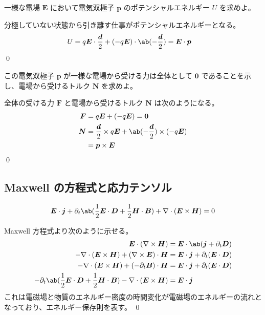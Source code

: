 \documentclass[uplatex,dvipdfmx,a4paper,11pt]{jlreq}
\makeatletter
\newcommand{\EE}{\bm{E}}
\newcommand{\DD}{\bm{D}}
\newcommand{\BB}{\bm{B}}
\newcommand{\HH}{\bm{H}}
\newcommand{\pp}{\bm{p}}
\newcommand{\vnabla}{\mathbf{\nabla}}
\theoremstyle{definition}
\renewenvironment{proof}[1][\proofname]{\par
  \normalfont
  \topsep6\p@\@plus6\p@ \trivlist
  \item[\hskip\labelsep{\bfseries #1}\@addpunct{\bfseries}]\ignorespaces\quad\par
}{%
  \qed\endtrivlist\@endpefalse
}
\renewcommand\proofname{証明}
\makeatother
\begin{document}
\begin{problem}
一様な電場 $\EE$ において電気双極子 $\pp$ のポテンシャルエネルギー $U$ を求めよ。
\end{problem}
\begin{proof}
  分極していない状態から引き離す仕事がポテンシャルエネルギーとなる。
  \begin{align}
    U & = q\bm{E}\cdot\frac{\bm{d}}{2} + (-q\bm{E})\cdot\ab(-\frac{\bm{d}}{2}) = \EE\cdot\pp
  \end{align}
\end{proof}

\begin{problem}
この電気双極子 $\bm{p}$ が一様な電場から受ける力は全体として $\bm{0}$ であることを示し、電場から受けるトルク $\bm{N}$ を求めよ。
\end{problem}
\begin{proof}
  全体の受ける力 $\bm{F}$ と電場から受けるトルク $\bm{N}$ は次のようになる。
  \begin{align}
    \bm{F} & = q\EE + (-q\EE) = \bm{0}                                           \\
    \bm{N} & = \frac{\bm{d}}{2}\times q\EE + \ab(-\frac{\bm{d}}{2})\times(-q\EE) \\
           & = \pp\times\EE
  \end{align}
\end{proof}

\subsection{Maxwell の方程式と応力テンソル}
\begin{problem}
\begin{align}
  \EE\cdot\bm{j} + \partial_t\ab(\frac{1}{2}\EE\cdot\DD + \frac{1}{2}\HH\cdot\BB) + \vnabla\cdot(\EE\times\HH) = 0
\end{align}
\end{problem}
\begin{proof}
  Maxwell 方程式より次のように示せる。
  \begin{align}
    \EE \cdot (\vnabla\times\HH)                                                                 & = \EE\cdot\ab(\bm{j} + \partial_t\DD)      \\
    -\vnabla\cdot(\EE\times\HH) + (\vnabla\times\EE)\cdot\HH                                     & = \EE\cdot\bm{j} + \partial_t(\EE\cdot\DD) \\
    -\vnabla\cdot(\EE\times\HH) + (-\partial_t\BB)\cdot\HH                                       & = \EE\cdot\bm{j} + \partial_t(\EE\cdot\DD) \\
    -\partial_t\ab(\frac{1}{2}\EE\cdot\DD + \frac{1}{2}\HH\cdot\BB) - \vnabla\cdot(\EE\times\HH) & = \EE\cdot\bm{j}
  \end{align}
  これは電磁場と物質のエネルギー密度の時間変化が電磁場のエネルギーの流れとなっており、エネルギー保存則を表す。
\end{proof}
\end{document}
